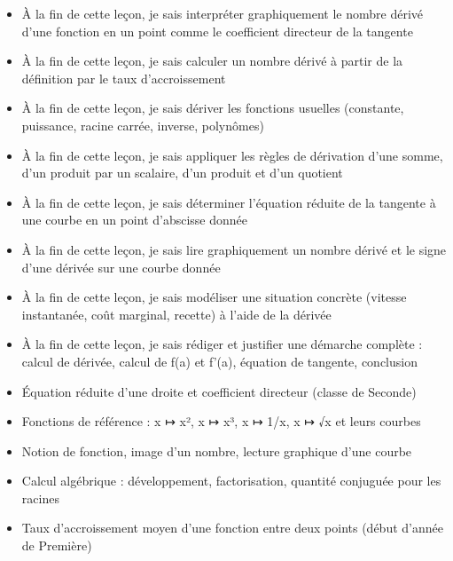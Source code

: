 \documentclass[11pt]{article}
\begin{document}
\begin{objectifs}
\begin{itemize}
\item À la fin de cette leçon, je sais interpréter graphiquement le nombre dérivé d'une fonction en un point comme le coefficient directeur de la tangente
\item À la fin de cette leçon, je sais calculer un nombre dérivé à partir de la définition par le taux d'accroissement
\item À la fin de cette leçon, je sais dériver les fonctions usuelles (constante, puissance, racine carrée, inverse, polynômes)
\item À la fin de cette leçon, je sais appliquer les règles de dérivation d'une somme, d'un produit par un scalaire, d'un produit et d'un quotient
\item À la fin de cette leçon, je sais déterminer l'équation réduite de la tangente à une courbe en un point d'abscisse donnée
\item À la fin de cette leçon, je sais lire graphiquement un nombre dérivé et le signe d'une dérivée sur une courbe donnée
\item À la fin de cette leçon, je sais modéliser une situation concrète (vitesse instantanée, coût marginal, recette) à l'aide de la dérivée
\item À la fin de cette leçon, je sais rédiger et justifier une démarche complète : calcul de dérivée, calcul de f(a) et f'(a), équation de tangente, conclusion
\end{itemize}
\end{objectifs}

\begin{prerequis}
\begin{itemize}
\item Équation réduite d'une droite et coefficient directeur (classe de Seconde)
\item Fonctions de référence : x ↦ x², x ↦ x³, x ↦ 1/x, x ↦ √x et leurs courbes
\item Notion de fonction, image d'un nombre, lecture graphique d'une courbe
\item Calcul algébrique : développement, factorisation, quantité conjuguée pour les racines
\item Taux d'accroissement moyen d'une fonction entre deux points (début d'année de Première)
\end{itemize}
\end{prerequis}

\newpage
\end{document}
